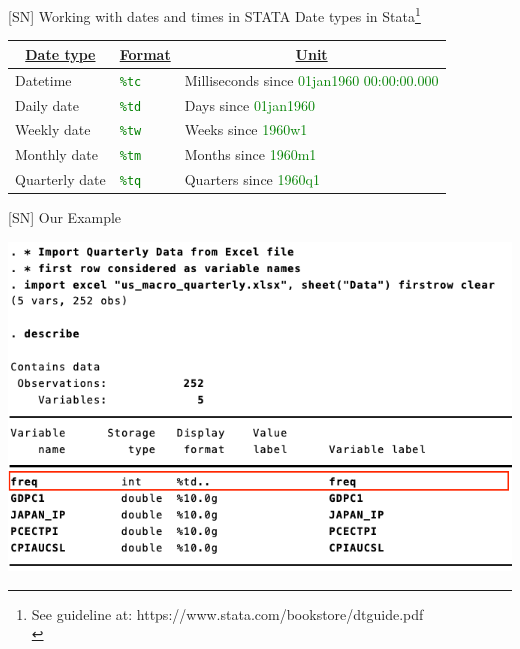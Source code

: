 \documentclass[
  10pt,
  ignorenonframetext,
]{beamer}
\begin{document}
\begin{frame}{{[}SN{]} Working with dates and times in STATA}
\protect\hypertarget{sn-working-with-dates-and-times-in-stata}{}
\centering Date types in
Stata\footnote[frame]{See guideline at: https://www.stata.com/bookstore/dtguide.pdf \\}
\vspace{0.6mm}

\begin{table}[]
\begin{tabular}{@{}lll@{}}
\toprule
\multicolumn{1}{c}{{\ul \textbf{Date type}}} & \multicolumn{1}{c}{{\ul \textbf{Format}}} & \multicolumn{1}{c}{{\ul \textbf{Unit}}} \\ \midrule
Datetime       & {\textcolor{green}{\texttt{\%tc}}} & Milliseconds since {\textcolor{green}{01jan1960 00:00:00.000}} \\
Daily date     & {\textcolor{green}{\texttt{\%td}}} & Days since {\textcolor{green}{01jan1960}}                     \\
Weekly date    & {\textcolor{green}{\texttt{\%tw}}} & Weeks since {\textcolor{green}{1960w1}}                        \\
Monthly date   & {\textcolor{green}{\texttt{\%tm}}} & Months since {\textcolor{green}{1960m1}}                       \\
Quarterly date & {\textcolor{green}{\texttt{\%tq}}} & Quarters since {\textcolor{green}{1960q1}}                     \\ \bottomrule
\end{tabular}
\end{table}
\end{frame}

\begin{frame}{{[}SN{]} Our Example}
\protect\hypertarget{sn-our-example}{}
\begin{flushleft}\includegraphics[width=1\linewidth]{pictures/S1-ImportExcelData} \end{flushleft}
\end{frame}
\end{document}
